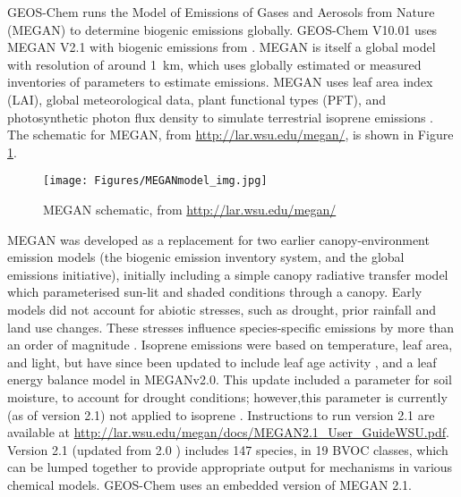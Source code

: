     
    GEOS-Chem runs the Model of Emissions of Gases and Aerosols from Nature (MEGAN) to determine biogenic emissions globally.
    GEOS-Chem V10.01 uses MEGAN V2.1 with biogenic emissions from \textcite{Guenther2012}.
    MEGAN is itself a global model with resolution of around 1~km, which uses globally estimated or measured %
    inventories of parameters to estimate emissions.
    MEGAN uses leaf area index (LAI), global meteorological data, plant functional types (PFT), and photosynthetic photon flux density to simulate terrestrial isoprene emissions \parencite{Kefauver2014}.
    The schematic for MEGAN, from \url{http://lar.wsu.edu/megan/}, is shown in Figure \ref{Model:GC:Isop:MEGAN:fig_megan_schematic}.
    
    \begin{figure}
      \texttt{[image: Figures/MEGANmodel\_img.jpg]}
      \caption{MEGAN schematic, from \url{http://lar.wsu.edu/megan/}}
      \label{Model:GC:Isop:MEGAN:fig_megan_schematic}
    \end{figure}
    
    MEGAN was developed as a replacement for two earlier canopy-environment emission models (the biogenic emission inventory system, and the global emissions initiative), initially including a simple canopy radiative transfer model which parameterised sun-lit and shaded conditions through a canopy.
    Early models did not account for abiotic stresses, such as drought, prior rainfall and land use changes. 
    These stresses influence species-specific emissions by more than an order of magnitude \parencite{Niinemets1999}.
    Isoprene emissions were based on temperature, leaf area, and light, but have since been updated to include leaf age activity \parencite{Guenther2000}, and a leaf energy balance model \parencite{Guenther2006} in MEGANv2.0.
    This update included a parameter for soil moisture, to account for drought conditions; however,this parameter is currently (as of version 2.1) not applied to isoprene \parencite{Sindelarova2014}.
    Instructions to run version 2.1 are available at \url{http://lar.wsu.edu/megan/docs/MEGAN2.1_User_GuideWSU.pdf}.
    Version 2.1 (updated from 2.0 \parencite{Guenther2006}) includes 147 species, in 19 BVOC classes, which can be lumped together to provide appropriate output for mechanisms in various chemical models.
    GEOS-Chem uses an embedded version of MEGAN 2.1.
    
